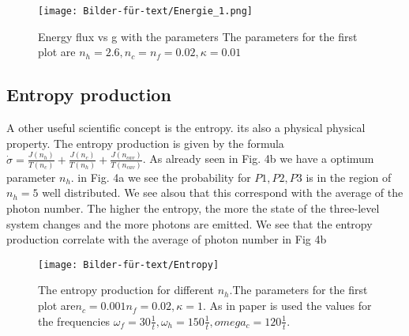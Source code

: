 \documentclass[12pt,a4paper]{article}
\begin{document}
\begin{figure}[hbtp]
\centering
\texttt{[image: Bilder-für-text/Energie\_1.png]}
\caption{Energy flux vs g with the parameters The parameters for the first plot are $ n_h=2.6,n_c= n_f=0.02,\kappa=0.01 $}
\end{figure}

\newpage
\subsection{Entropy production}
A other useful scientific concept is the entropy. its also a physical physical property. 
The entropy production is given by the formula\\ $\dot{\sigma} =\frac{J(n_h)}{T(n_c)}+\frac{J(n_c)}{T(n_h)}+\frac{J(n_{cav})}{T(n_{cav})}$.
As already seen in Fig. 4b we have a optimum parameter $n_h$.  in Fig. 4a we see the probability for $P1,P2,P3$ is in the region of $n_h=5 $ well distributed. We see alsou that  this correspond with the average of the photon number.
The higher the entropy, the more the state of the three-level system changes and the more photons are emitted.
We see that the entropy production correlate with the average of photon number in Fig 4b
\begin{figure}[hbtp]
\centering
\texttt{[image: Bilder-für-text/Entropy]}
\caption{The entropy production for different $n_h$.The parameters for the first plot are$n_c=0.001 n_f=0.02,\kappa=1$. As in paper \cite{Li2017} is used the values for the frequencies $\omega_f=30\frac{1}{t},\omega_h=150\frac{1}{t}, omega_c=120\frac{1}{t}$.}
\end{figure}



\newpage
\end{document}
